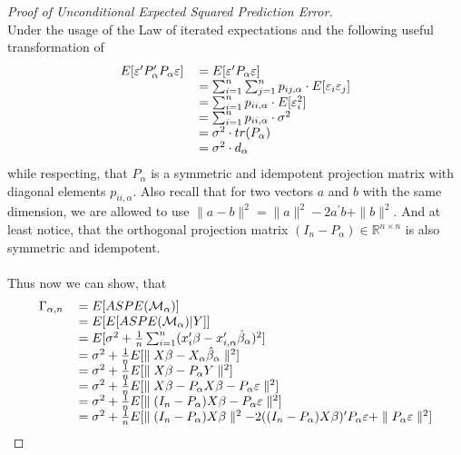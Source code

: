 \documentclass[Research_Module_ES.tex]{subfiles}
\begin{document}
\begin{proof}[Proof of Unconditional Expected Squared Prediction Error]~\\
	Under the usage of the Law of iterated expectations and the following useful transformation of
	\begin{align*}
	\begin{tabular}{ll}
	$E[\varepsilon^\prime P_\alpha^\prime P_\alpha\varepsilon]$&$=E[\varepsilon^\prime P_\alpha\varepsilon]$\\
	&$=\sum_{i=1}^{n}\sum_{j=1}^{n}p_{ij,\alpha}\cdot E[\varepsilon_i\varepsilon_j]$\\
	&$=\sum_{i=1}^{n}p_{ii,\alpha}\cdot E[\varepsilon_i^2]$\\
	&$=\sum_{i=1}^{n}p_{ii,\alpha}\cdot \sigma^2$\\
	&$=\sigma^2\cdot tr(P_\alpha)$\\
	&$=\sigma^2\cdot d_\alpha$
	\end{tabular}
	\end{align*}
	while respecting, that $P_\alpha$ is a symmetric and idempotent projection matrix with diagonal elements $p_{ii,\alpha}$. Also recall that for two vectors $a$ and $b$ with the same dimension, we are allowed to use $\parallel a-b\parallel^2=\parallel a\parallel^2-2a^\prime b+\parallel b\parallel^2$. And at least notice, that the orthogonal projection matrix $(I_n-P_\alpha)\in\mathbb{R}^{n\times n}$ is also symmetric and idempotent.\\\\
	Thus now we can show, that
	\begin{align*}
	\begin{tabular}{ll}
	$\Gamma_{\alpha,n}$&$=E[ASPE(\mathcal{M}_\alpha)]$\\
	&$=E[E[ASPE(\mathcal{M}_\alpha)|Y]]$\\
	&$=E[\sigma^2+\frac{1}{n}\sum_{i=1}^{n}(x_i^\prime\beta-x_{i,\alpha}^\prime\hat{\beta}_\alpha)^2]$\\
	&$=\sigma^2+\frac{1}{n}E[\parallel X\beta-X_\alpha\hat{\beta}_\alpha\parallel^2]$\\
	&$=\sigma^2+\frac{1}{n}E[\parallel X\beta-P_\alpha Y\parallel^2]$\\
	&$=\sigma^2+\frac{1}{n}E[\parallel X\beta-P_\alpha X\beta-P_\alpha\varepsilon\parallel^2]$\\
	&$=\sigma^2+\frac{1}{n}E[\parallel (I_n-P_\alpha)X\beta-P_\alpha\varepsilon\parallel^2]$\\
	&$=\sigma^2+\frac{1}{n}E[\parallel (I_n-P_\alpha)X\beta\parallel^2-2((I_n-P_\alpha) X\beta)^\prime P_\alpha\varepsilon+\parallel P_\alpha\varepsilon\parallel^2]$\\

\end{tabular}
\end{align*}
\end{proof}
\end{document}
